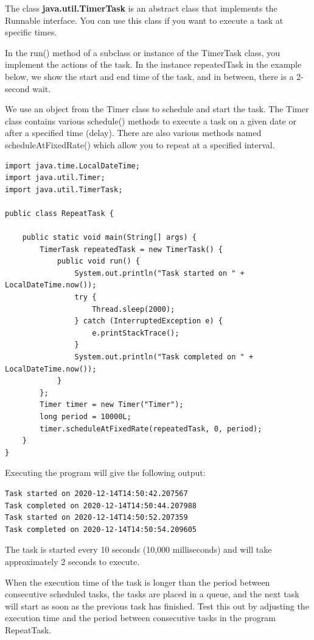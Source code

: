The class \textbf{java.util.TimerTask} is an abstract class that implements the Runnable interface. You can use this class if you want to execute a task at specific times.

In the run() method of a subclass or instance of the TimerTask class, you implement the actions of the task. In the instance repeatedTask in the example below, we show the start and end time of the task, and in between, there is a 2-second wait.

We use an object from the Timer class to schedule and start the task.
The Timer class contains various schedule() methods to execute a task on a given date or after a specified time (delay). There are also various methods named scheduleAtFixedRate() which allow you to repeat at a specified interval.

\begin{lstlisting}
import java.time.LocalDateTime;
import java.util.Timer;
import java.util.TimerTask;

public class RepeatTask {

	public static void main(String[] args) {
		TimerTask repeatedTask = new TimerTask() {
			public void run() {
				System.out.println("Task started on " + LocalDateTime.now());
				try {
					Thread.sleep(2000);
				} catch (InterruptedException e) {
					e.printStackTrace();
				}
				System.out.println("Task completed on " + LocalDateTime.now());
			}
		};
		Timer timer = new Timer("Timer");
		long period = 10000L;
		timer.scheduleAtFixedRate(repeatedTask, 0, period);
	}
}
\end{lstlisting}

Executing the program will give the following output:

\begin{verbatim}
Task started on 2020-12-14T14:50:42.207567
Task completed on 2020-12-14T14:50:44.207988
Task started on 2020-12-14T14:50:52.207359
Task completed on 2020-12-14T14:50:54.209605
\end{verbatim}

The task is started every 10 seconds (10,000 milliseconds) and will take approximately 2 seconds to execute.

When the execution time of the task is longer than the period between consecutive scheduled tasks, the tasks are placed in a queue, and the next task will start as soon as the previous task has finished. Test this out by adjusting the execution time and the period between consecutive tasks in the program RepeatTask.

